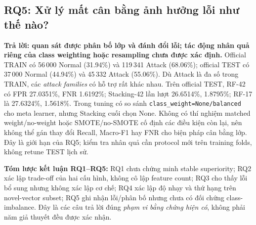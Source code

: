 \subsection{RQ5: Xử lý mất cân bằng ảnh hưởng lỗi như thế nào?}
\label{sec:revision-rq5}
\textbf{Trả lời: quan sát được phân bố lớp và đánh đổi lỗi; tác động nhân quả riêng của class weighting hoặc resampling chưa được xác định.}
Official TRAIN có 56\,000 Normal (31.94\%) và 119\,341 Attack (68.06\%); official TEST có 37\,000 Normal (44.94\%) và 45\,332 Attack (55.06\%). Dù Attack là đa số trong TRAIN, các \emph{attack families} có hỗ trợ rất khác nhau. Trên official TEST, RF-42 có FPR 27.0351\%, FNR 1.6192\%; Stacking-42 lần lượt 26.6514\%, 1.8795\%; RF-17 là 27.6324\%, 1.5618\%.
Trong tuning có so sánh \texttt{class\_weight=None/balanced} cho meta learner, nhưng Stacking cuối chọn None. Không có thí nghiệm matched weight/no-weight hoặc SMOTE/no-SMOTE cố định các điều kiện còn lại, nên không thể gán thay đổi Recall, Macro-F1 hay FNR cho biện pháp cân bằng lớp. Đây là giới hạn của RQ5; kiểm tra nhân quả cần protocol mới trên training folds, không retune TEST lịch sử.

\noindent\textbf{Tóm lược kết luận RQ1--RQ5:} RQ1 chưa chứng minh stable superiority; RQ2 xác lập trade-off của hai cấu hình, không cô lập feature count; RQ3 cho thấy lỗi bổ sung nhưng không xác lập cơ chế; RQ4 xác lập độ nhạy và thứ hạng trên novel-vector subset; RQ5 ghi nhận lỗi/phân bố nhưng chưa có đối chứng class-imbalance. Đây là các câu trả lời đúng \emph{phạm vi bằng chứng hiện có}, không phải năm giả thuyết đều được xác nhận.
